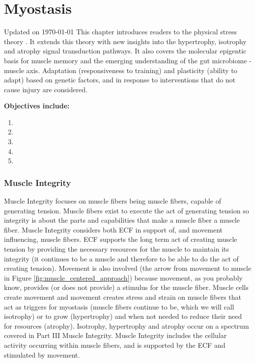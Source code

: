 \chapter{Myostasis}\label{chp:myostasis}
Updated on \today
\minitoc
This chapter introduces readers to the physical stress theory \cite{mueller_tissue_2002}. It extends this theory with new insights into the hypertrophy, isotrophy and atrophy signal transduction pathways. It also covers the molecular epigentic basis for muscle memory and the emerging understanding of the gut microbiome - muscle axis. Adaptation (responsiveness to training) and plasticity (ability to adapt) based on genetic factors, and in response to interventions that do not cause injury are considered.


\vspace{5mm}

\textbf{Objectives include:}
\begin{enumerate}
    \item
    \item
    \item
    \item
    \item
\end{enumerate}

\subsection{Muscle Integrity}
Muscle Integrity focuses on muscle fibers being muscle fibers, capable of generating tension. Muscle fibers exist to execute the act of generating tension so integrity is about the parts and capabilities that make a muscle fiber a muscle fiber. Muscle Integrity considers both ECF in support of, and movement influencing, muscle fibers. ECF supports the long term act of creating muscle tension by providing the necessary resources for the muscle to maintain its integrity (it continues to be a muscle and therefore to be able to do the act of creating tension). Movement is also involved (the arrow from movement to muscle in Figure \ref{fig:muscle_centered_approach}) because movement, as you probably know, provides (or does not provide) a stimulus for the muscle fiber. Muscle cells create movement and movement creates stress and strain on muscle fibers that act as triggers for myostasis (muscle fibers continue to be, which we will call isotrophy) or to grow (hypertrophy) and when not needed to reduce their need for resources (atrophy). Isotrophy, hypertrophy and atrophy occur on a spectrum covered in Part III Muscle Integrity. Muscle Integrity includes the cellular activity occurring within muscle fibers, and is supported by the ECF and stimulated by movement.

